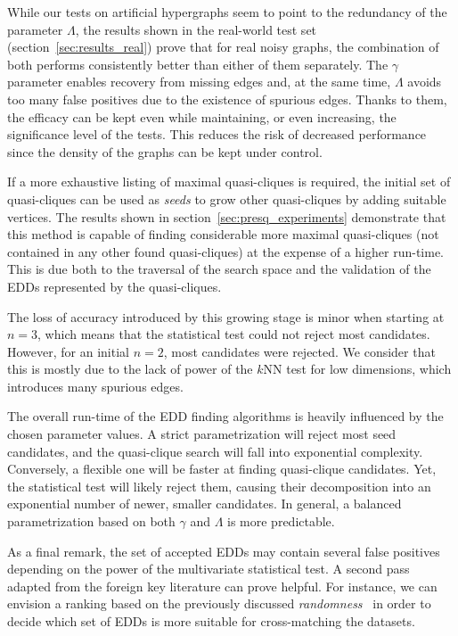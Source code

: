 While our tests on artificial hypergraphs seem to point to the redundancy of the parameter $\Lambda$,
the results shown in the real-world test set (section~\ref{sec:results_real}) prove that for real noisy graphs,
the combination of both performs consistently better than
either of them separately. The $\gamma$ parameter enables recovery from missing edges and,
at the same time, $\Lambda$ avoids too many false positives due to the existence of
spurious edges. Thanks to them, the efficacy can be kept even while maintaining, or even
increasing, the significance level of the tests. This reduces the risk of decreased
performance since the density of the graphs can be kept under control.

If a more exhaustive listing of maximal quasi-cliques is required, the initial set of
quasi-cliques can be used as \emph{seeds} to grow other quasi-cliques by adding suitable vertices.
The results shown in  section~\ref{sec:presq_experiments} demonstrate that this method is capable of
finding considerable more maximal quasi-cliques (not contained in any other found quasi-cliques)
at the expense of a higher run-time. This is due both to the traversal of the search space and the
validation of the \glspl{EDD} represented by the quasi-cliques.

The loss of accuracy introduced by this growing stage is minor when starting at $n = 3$,
which means that the statistical test could not reject most candidates. However, for an
initial $n = 2$, most candidates were rejected. We consider that this is mostly due
to the lack of power of the $k$NN test for low dimensions, which introduces
many spurious edges.

The overall run-time of the \gls{EDD} finding algorithms is heavily influenced by the
chosen parameter values.
A strict parametrization will reject most seed candidates, and the quasi-clique search will fall
into exponential complexity. Conversely, a flexible one will be faster at finding
quasi-clique candidates. Yet, the statistical test will likely reject them, causing their decomposition
into an exponential number of newer, smaller candidates.
In general, a balanced parametrization based on both $\gamma$ and $\Lambda$ is more predictable.

As a final remark, the set of accepted \glspl{EDD} may contain several false positives depending on the power of
the multivariate statistical test. A second pass adapted from the foreign key literature can prove helpful.
For instance, we can envision a ranking based on the previously discussed \emph{randomness}~\cite{Zhang2010}
in order to decide which set of \glspl{EDD} is more suitable for cross-matching the datasets.

